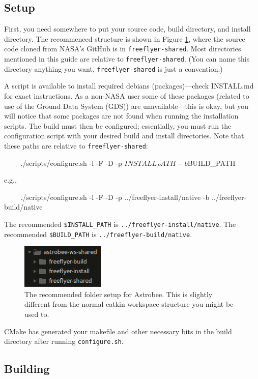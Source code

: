 \documentclass{article}
\begin{document}
\subsection{Setup}
First, you need somewhere to put your source code, build directory, and install directory. The recommenced structure is shown in Figure \ref{fig:my_label}, where the source code cloned from NASA's GitHub is in \texttt{freeflyer-shared}. Most directories mentioned in this guide are relative to \texttt{freeflyer-shared}. (You can name this directory anything you want, \texttt{freeflyer-shared} is just a convention.)

A script is available to install required debians (packages)---check INSTALL.md for exact instructions. As a non-NASA user some of these packages (related to use of the Ground Data System (GDS)) are unavailable---this is okay, but you will notice that some packages are not found when running the installation scripts. The build must then be configured; essentially, you must run the configuration script with your desired build and install directories. Note that these paths are relative to \texttt{freeflyer-shared}:
\begin{markdown}
~~~~
./scripts/configure.sh -l -F -D -p $INSTALL_PATH -b $BUILD_PATH
~~~~

e.g.,

~~~~
./scripts/configure.sh -l -F -D -p ../freeflyer-install/native
-b ../freeflyer-build/native
~~~~
\end{markdown}

The recommended \texttt{\$INSTALL\_PATH} is \texttt{../freeflyer-install/native}. The recommended \texttt{\$BUILD\_PATH} is \texttt{../freeflyer-build/native}. 

\begin{figure}[h!]
    \centering
    \includegraphics[height=80px]{img/folders.png}
    \caption{The recommended folder setup for Astrobee. This is slightly different from the normal catkin workspace structure you might be used to.}
    \label{fig:my_label}
\end{figure}

CMake has generated your makefile and other necessary bits in the build directory after running \texttt{configure.sh}.

\subsection{Building}
\end{document}
